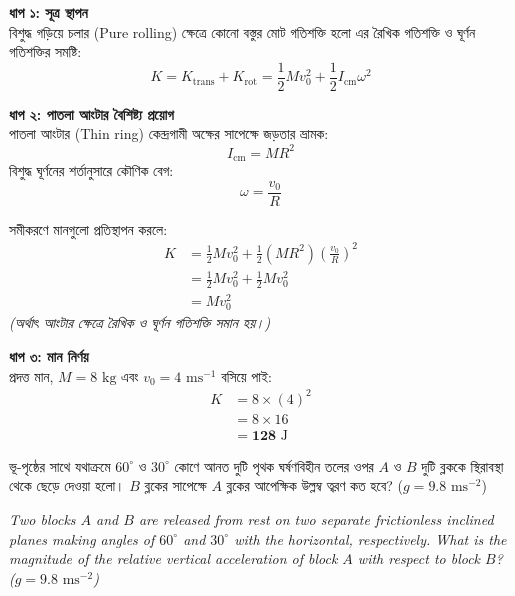 \documentclass[12pt, a4paper]{article}
\begin{document}
\begin{tcolorbox}[solutionbox={সমাধান (Solution)}]
    \noindent
    \textbf{ধাপ ১: সূত্র স্থাপন} \\
    বিশুদ্ধ গড়িয়ে চলার (Pure rolling) ক্ষেত্রে কোনো বস্তুর মোট গতিশক্তি হলো এর রৈখিক গতিশক্তি ও ঘূর্ণন গতিশক্তির সমষ্টি:
    \[ K = K_{\text{trans}} + K_{\text{rot}} = \frac{1}{2} M v_0^2 + \frac{1}{2} I_{\text{cm}} \omega^2 \]
    
    \vspace{0.5em}
    \noindent\textbf{ধাপ ২: পাতলা আংটার বৈশিষ্ট্য প্রয়োগ} \\
    পাতলা আংটার (Thin ring) কেন্দ্রগামী অক্ষের সাপেক্ষে জড়তার ভ্রামক:
    \[ I_{\text{cm}} = M R^2 \]
    বিশুদ্ধ ঘূর্ণনের শর্তানুসারে কৌণিক বেগ:
    \[ \omega = \frac{v_0}{R} \]
    
    সমীকরণে মানগুলো প্রতিস্থাপন করলে:
    \begin{align*}
        K &= \frac{1}{2} M v_0^2 + \frac{1}{2} (M R^2) \left(\frac{v_0}{R}\right)^2 \\
          &= \frac{1}{2} M v_0^2 + \frac{1}{2} M v_0^2 \\
          &= M v_0^2
    \end{align*}
    \textit{(অর্থাৎ আংটার ক্ষেত্রে রৈখিক ও ঘূর্ণন গতিশক্তি সমান হয়।)}
    
    \vspace{0.5em}
    \noindent\textbf{ধাপ ৩: মান নির্ণয়} \\
    প্রদত্ত মান, $M = 8\text{ kg}$ এবং $v_0 = 4\text{ ms}^{-1}$ বসিয়ে পাই:
    \begin{align*}
        K &= 8 \times (4)^2 \\
          &= 8 \times 16 \\
          &= \mathbf{128}\text{ J}
    \end{align*}
\end{tcolorbox}

\begin{tcolorbox}[questionbox={প্রশ্ন (Question) 18}]
    \noindent
    ভূ-পৃষ্ঠের সাথে যথাক্রমে $60^\circ$ ও $30^\circ$ কোণে আনত দুটি পৃথক ঘর্ষণবিহীন তলের ওপর $A$ ও $B$ দুটি ব্লককে স্থিরাবস্থা থেকে ছেড়ে দেওয়া হলো। $B$ ব্লকের সাপেক্ষে $A$ ব্লকের আপেক্ষিক উল্লম্ব ত্বরণ কত হবে? ($g = 9.8\text{ ms}^{-2}$)
    
    \vspace{0.8em}
    \begin{english}
    \noindent\textit{\color{darkgray}
    Two blocks $A$ and $B$ are released from rest on two separate frictionless inclined planes making angles of $60^\circ$ and $30^\circ$ with the horizontal, respectively. What is the magnitude of the relative vertical acceleration of block $A$ with respect to block $B$? ($g = 9.8\text{ ms}^{-2}$)
    }
    \end{english}
\end{tcolorbox}
\end{document}
